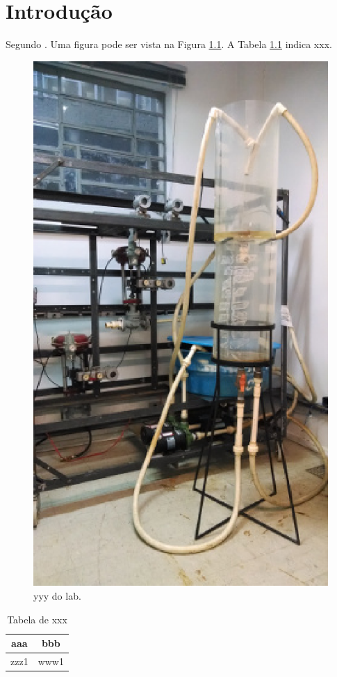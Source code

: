 \documentclass{automatextcc}
\begin{document}
\chapter{Introdução}
Segundo \cite{Bazanella:GomesdaSilva:2006}. Uma figura pode ser vista na Figura \ref{tanque}. A Tabela \ref{tabela_nota} indica xxx.
\begin{figure}[htb]%
\centering
\includegraphics[width=0.5\columnwidth]{tanques}%
\caption{yyy do lab.}%
\label{tanque}%
\end{figure}
\begin{table}[htb]%
\centering
\begin{tabular}{|c|c|}
\hline
aaa & bbb\\
\hline
zzz1 & www1\\
\hline
\end{tabular}
\caption{Tabela de xxx}
\label{tabela_nota}
\end{table}


\end{document}
